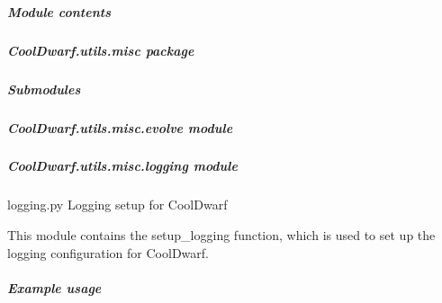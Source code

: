 \documentclass[letterpaper,10pt,english]{sphinxmanual}
\begin{document}
\begin{fulllineitems}
\label{\detokenize{CoolDwarf.utils.math:CoolDwarf.utils.math.kernel.make_3d_kernels}}
\pysigstartsignatures
{}
\pysigstopsignatures
\end{fulllineitems}



\subparagraph{Module contents}
\label{\detokenize{CoolDwarf.utils.math:module-CoolDwarf.utils.math}}\label{\detokenize{CoolDwarf.utils.math:module-contents}}
\sphinxstepscope


\subparagraph{CoolDwarf.utils.misc package}
\label{\detokenize{CoolDwarf.utils.misc:cooldwarf-utils-misc-package}}\label{\detokenize{CoolDwarf.utils.misc::doc}}

\subparagraph{Submodules}
\label{\detokenize{CoolDwarf.utils.misc:submodules}}

\subparagraph{CoolDwarf.utils.misc.evolve module}
\label{\detokenize{CoolDwarf.utils.misc:cooldwarf-utils-misc-evolve-module}}

\subparagraph{CoolDwarf.utils.misc.logging module}
\label{\detokenize{CoolDwarf.utils.misc:module-CoolDwarf.utils.misc.logging}}\label{\detokenize{CoolDwarf.utils.misc:cooldwarf-utils-misc-logging-module}}
\sphinxAtStartPar
logging.py \textendash{} Logging setup for CoolDwarf

\sphinxAtStartPar
This module contains the setup\_logging function, which is used to set up the logging configuration for CoolDwarf.


\subparagraph{Example usage}
\label{\detokenize{CoolDwarf.utils.misc:example-usage}}
\begin{sphinxVerbatim}[commandchars=\\\{\}]
   
\end{sphinxVerbatim}
\end{document}
